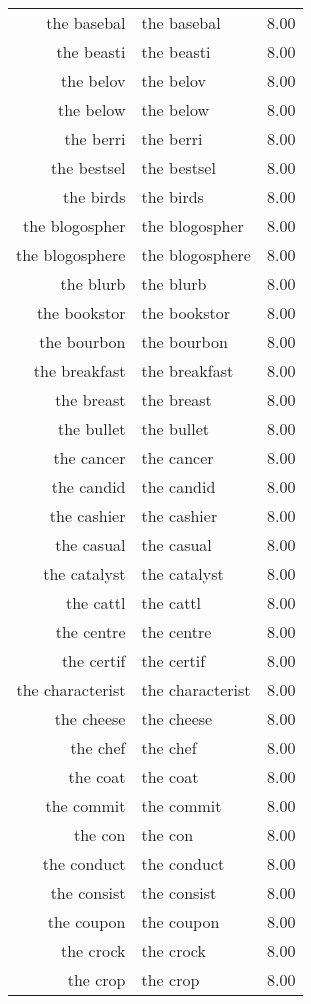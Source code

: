 \begin{table}[ht]
\begin{tabular}{rlr}
  the basebal & the basebal & 8.00 \\ 
  the beasti & the beasti & 8.00 \\ 
  the belov & the belov & 8.00 \\ 
  the below & the below & 8.00 \\ 
  the berri & the berri & 8.00 \\ 
  the bestsel & the bestsel & 8.00 \\ 
  the birds & the birds & 8.00 \\ 
  the blogospher & the blogospher & 8.00 \\ 
  the blogosphere & the blogosphere & 8.00 \\ 
  the blurb & the blurb & 8.00 \\ 
  the bookstor & the bookstor & 8.00 \\ 
  the bourbon & the bourbon & 8.00 \\ 
  the breakfast & the breakfast & 8.00 \\ 
  the breast & the breast & 8.00 \\ 
  the bullet & the bullet & 8.00 \\ 
  the cancer & the cancer & 8.00 \\ 
  the candid & the candid & 8.00 \\ 
  the cashier & the cashier & 8.00 \\ 
  the casual & the casual & 8.00 \\ 
  the catalyst & the catalyst & 8.00 \\ 
  the cattl & the cattl & 8.00 \\ 
  the centre & the centre & 8.00 \\ 
  the certif & the certif & 8.00 \\ 
  the characterist & the characterist & 8.00 \\ 
  the cheese & the cheese & 8.00 \\ 
  the chef & the chef & 8.00 \\ 
  the coat & the coat & 8.00 \\ 
  the commit & the commit & 8.00 \\ 
  the con & the con & 8.00 \\ 
  the conduct & the conduct & 8.00 \\ 
  the consist & the consist & 8.00 \\ 
  the coupon & the coupon & 8.00 \\ 
  the crock & the crock & 8.00 \\ 
  the crop & the crop & 8.00 \\ 

\end{tabular}
\end{table}
